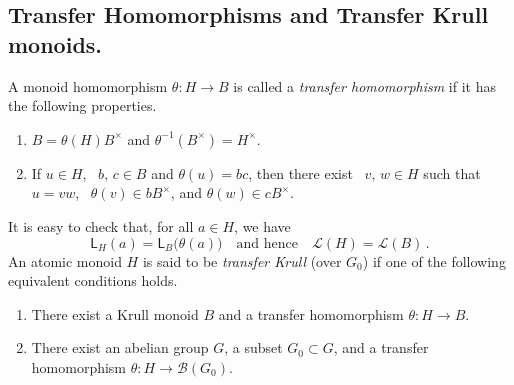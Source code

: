 \documentclass[a4paper, 10pt]{amsart}
\theoremstyle{plain}
\theoremstyle{definition}
\theoremstyle{definition}
\numberwithin{equation}{section}
\begin{document}
\smallskip
\noindent
\subsection{Transfer Homomorphisms and Transfer Krull monoids.} \label{2.4}
A monoid homomorphism  $\theta \colon H \to B$ is called a {\it transfer homomorphism} if it has the following properties.

\begin{enumerate}
\item[{\bf (T\,1)\,}] $B = \theta(H) B^\times$  and  $\theta^{-1} (B^\times) = H^\times$.

\item[{\bf (T\,2)\,}] If $u \in H$, \ $b,\,c \in B$  and  $\theta (u) = bc$, then there exist \ $v,\,w \in H$ such that  $u = vw$, \  $\theta (v) \in bB^{\times}$, and  $\theta (w) \in c B^{\times}$.
\end{enumerate}
It is easy to check that, for all $a \in H$, we have
\[
\mathsf L_H (a) = \mathsf L_B \big( \theta (a) \big) \quad \text{and hence} \quad \mathcal L (H) = \mathcal L (B) \,.
\]
An atomic monoid $H$ is said to be {\it transfer Krull} (over $G_0$) if one of the following equivalent conditions holds.
\begin{enumerate}
\item[(a)] There exist a Krull monoid $B$ and a transfer homomorphism $\theta \colon H \to B$.

\item[(b)] There exist an abelian group $G$, a subset $G_0 \subset G$, and a transfer homomorphism $\theta \colon H \to \mathcal B (G_0)$.
\end{enumerate}
\end{document}
